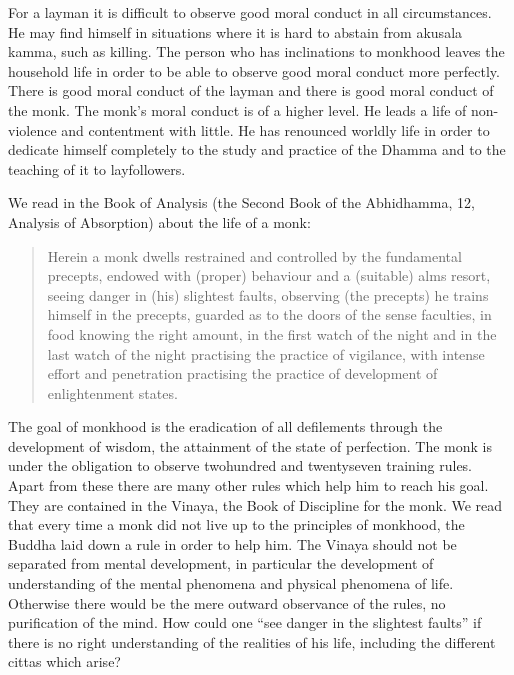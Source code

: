 \documentclass{book}
\begin{document}
For a layman it is difficult to observe good moral conduct in all
circumstances. He may find himself in situations where it is hard to
abstain from akusala kamma, such as killing. The person who has
inclinations to monkhood leaves the household life in order to be able
to observe good moral conduct more perfectly. There is good moral
conduct of the layman and there is good moral conduct of the monk. The
monk's moral conduct is of a higher level. He leads a life of
non-violence and contentment with little. He has renounced worldly life
in order to dedicate himself completely to the study and practice of the
Dhamma and to the teaching of it to layfollowers.

We read in the Book of Analysis (the Second Book of the Abhidhamma, 12,
Analysis of Absorption) about the life of a monk:

\begin{quote}
Herein a monk dwells restrained and controlled by the fundamental
precepts, endowed with (proper) behaviour and a (suitable) alms resort,
seeing danger in (his) slightest faults, observing (the precepts) he
trains himself in the precepts, guarded as to the doors of the sense
faculties, in food knowing the right amount, in the first watch of the
night and in the last watch of the night practising the practice of
vigilance, with intense effort and penetration practising the practice
of development of enlightenment states.
\end{quote}

The goal of monkhood is the eradication of all defile­ments through the
development of wisdom, the attainment of the state of perfection. The
monk is under the obligation to observe twohundred and twentyseven
training rules. Apart from these there are many other rules which help
him to reach his goal. They are contained in the Vinaya, the Book of
Discipline for the monk. We read that every time a monk did not live up
to the principles of monkhood, the Buddha laid down a rule in order to
help him. The Vinaya should not be separated from mental development, in
particular the development of understanding of the mental phenomena and
physical phenomena of life. Otherwise there would be the mere outward
observance of the rules, no purification of the mind. How could one
``see danger in the slightest faults'' if there is no right
understanding of the realities of his life, including the different
cittas which arise?
\end{document}
